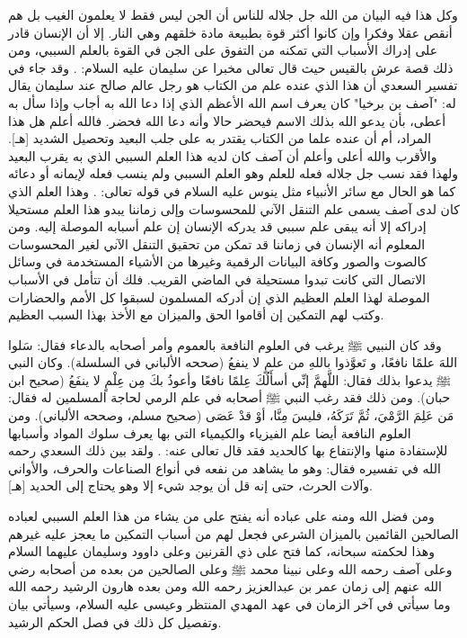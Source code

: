 وكل هذا فيه البيان من الله جل جلاله للناس أن الجن ليس فقط لا يعلمون الغيب بل هم أنقص عقلا وفكرا وإن كانوا أكثر قوة بطبيعة مادة خلقهم وهي النار. إلا أن الإنسان قادر على إدراك الأسباب التي تمكنه من التفوق على الجن في القوة بالعلم السببي، ومن ذلك قصة عرش بالقيس حيث قال تعالى مخبرا عن سليمان عليه السلام:
\quranayah*[27][38-40]{\footnotesize \surahname*[27]}. وقد جاء في تفسير السعدي أن هذا الذي عنده علم من الكتاب هو رجل عالم صالح عند سليمان يقال له: "آصف بن برخيا" كان يعرف اسم الله الأعظم الذي إذا دعا الله به أجاب وإذا سأل به أعطى، بأن يدعو الله بذلك الاسم فيحضر حالا وأنه دعا الله فحضر. فالله أعلم هل هذا المراد، أم أن عنده علما من الكتاب يقتدر به على جلب البعيد وتحصيل الشديد [هـ].
والأقرب والله أعلى وأعلم أن آصف كان لديه هذا العلم السببي الذي به يقرب البعيد ولهذا فقد نسب جل جلاله فعله للعلم وهو العلم السببي ولم ينسب فعله لإيمانه أو دعائه كما هو الحال مع سائر الأنبياء مثل ينوس عليه السلام في قوله تعالى:
\quranayah*[21][88]{\footnotesize \surahname*[21]}. وهذا العلم الذي كان لدى آصف يسمى علم التنقل الآني للمحسوسات وإلى زماننا يبدو هذا العلم مستحيلا إدراكه إلا أنه يبقى علم سببي قد يدركه الإنسان إن علم أسبابه الموصلة إليه. ومن المعلوم أنه الإنسان في زماننا قد تمكن من تحقيق التنقل الآني لغير المحسوسات كالصوت والصور وكافة البيانات الرقمية وغيرها من الأشياء المستخدمة في وسائل الاتصال التي كانت تبدوا مستحيلة في الماضي القريب. فلك أن تتأمل في الأسباب الموصلة لهذا العلم العظيم الذي إن أدركه المسلمون لسبقوا كل الأمم والحضارات وكتب لهم التمكين إن أقاموا الحق والميزان مع الأخذ بهذا السبب العظيم.

وقد كان النبيي ﷺ يرغب في العلوم النافعة بالعموم وأمر أصحابه بالدعاء فقال:
سَلوا اللهَ علمًا نافعًا، و تَعوَّذوا باللهِ من علمٍ لا ينفعُ {\footnotesize (صححه الألباني في السلسلة)}. وكان النبي ﷺ يدعوا بذلك فقال: اللَّهمَّ إنِّي أسأَلُكَ عِلمًا نافعًا وأعوذُ بكَ مِن عِلْمٍ لا ينفَعُ {\footnotesize (صحيح ابن حبان)}. ومن ذلك فقد رغب النبي ﷺ أصحابه في علم الرمي لحاجة المسلمين له فقال: مَن عَلِمَ الرَّمْيَ، ثُمَّ تَرَكَهُ، فليسَ مِنَّا، أوْ قدْ عَصَى {\footnotesize (صحيح مسلم، وصححه الألباني)}. ومن العلوم النافعة أيضا علم الفيزياء والكيمياء التي بها يعرف سلوك المواد وأسبابها للإستفادة منها والإنتفاع بها كالحديد فقد قال تعالى عنه: \quranayah*[57][25][12-18]{\footnotesize \surahname*[57]}. ولقد بين ذلك السعدي رحمه الله في تفسيره فقال: وهو ما يشاهد من نفعه في أنواع الصناعات والحرف، والأواني وآلات الحرث، حتى إنه قل أن يوجد شيء إلا وهو يحتاج إلى الحديد [هـ].

ومن فضل الله ومنه على عباده أنه يفتح على من يشاء من هذا العلم السببي لعباده الصالحين القائمين بالميزان الشرعي فجعل لهم من أسباب التمكين ما يعجز عليه غيرهم وهذا لحكمته سبحانه، كما فتح على ذي القرنين  وعلى داوود وسليمان عليهما السلام وعلى آصف رحمه الله وعلى نبينا محمد ﷺ وعلى الصالحين من بعده من أصحابه رضي الله عنهم إلى زمان عمر بن عبدالعزيز رحمه الله ومن بعده هارون الرشيد رحمه الله وما سيأتي في آخر الزمان في عهد المهدي المنتظر وعيسى عليه السلام، وسيأتي بيان وتفصيل كل ذلك في فصل الحكم الرشيد. 


